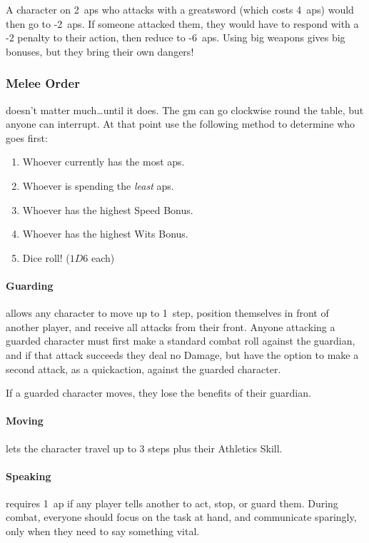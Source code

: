 \begin{multicols}{2}
\begin{exampletext}
  A character on 2~\glspl{ap} who attacks with a greatsword (which costs 4~\glspl{ap}) would then go to -2~\glspl{ap}.
  If someone attacked them, they would have to respond with a -2 penalty to their action, then reduce to -6~\glspl{ap}.
  Using big weapons gives big bonuses, but they bring their own dangers!
\end{exampletext}

\subsubsection{Melee Order}
doesn't matter much\ldots until it does.
The \gls{gm} can go clockwise round the table, but anyone can interrupt.
At that point use the following method to determine who goes first:

\begin{enumerate}
  \item
  Whoever currently has the most \glspl{ap}.
  \item
  Whoever is spending the \emph{least} \glspl{ap}.
  \item
  Whoever has the highest Speed Bonus.
  \item
  Whoever has the highest Wits Bonus.
  \item
  Dice roll! ($1D6$ each)
\end{enumerate}

\paragraph{Guarding}
\label{guarding}
allows any character to move up to 1~\gls{step}, position themselves in front of another player, and receive all attacks from their front.
Anyone attacking a guarded character must first make a standard combat roll against the guardian, and if that attack succeeds they deal no Damage, but have the option to make a second attack, as a \gls{quickaction}, against the guarded character.

If a guarded character moves, they lose the benefits of their guardian.

\paragraph{Moving}
\label{moving}
lets the character travel up to 3 steps plus their Athletics Skill.

\paragraph{Speaking}
requires 1~\gls{ap} if any player tells another to act, stop, or guard them.
During combat, everyone should focus on the task at hand, and communicate sparingly, only when they need to say something vital.


\end{multicols}
